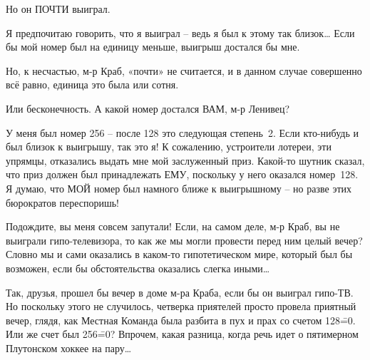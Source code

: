 \documentclass[../main.tex]{subfiles}
\begin{document}
\begin{dialogue}
 Но он ПОЧТИ выиграл.

 Я предпочитаю говорить, что я выиграл \--- ведь я был к этому так близок\ldots{} Если бы мой номер был на единицу меньше, выигрыш достался бы мне.

 Но, к несчастью, м-р Краб, «почти» не считается, и в данном случае совершенно всё равно, единица это была или сотня.

 Или бесконечность. А какой номер достался ВАМ, м-р Ленивец?

 У меня был номер 256 \--- после 128 это следующая степень~2. Если кто-нибудь и был близок к выигрышу, так это я! К сожалению, устроители лотереи, эти упрямцы, отказались выдать мне мой заслуженный приз. Какой-то шутник сказал, что приз должен был принадлежать ЕМУ, поскольку у него оказался номер~128. Я думаю, что МОЙ номер был намного ближе к выигрышному \--- но разве этих бюрократов переспоришь!

 Подождите, вы меня совсем запутали! Если, на самом деле, м-р Краб, вы не выиграли гипо-телевизора, то как же мы могли провести перед ним целый вечер? Словно мы и сами оказались в каком-то гипотетическом мире, который был бы возможен, если бы обстоятельства оказались слегка иными\ldots{}

 Так, друзья, прошел бы вечер в доме м-ра Краба, если бы он выиграл гипо-ТВ. Но поскольку этого не случилось, четверка приятелей просто провела приятный вечер, глядя, как Местная Команда была разбита в пух и прах со счетом 128\==0. Или же счет был 256\==0? Впрочем, какая разница, когда речь идет о пятимерном Плутонском хоккее на пару\ldots{}

\end{dialogue}
\end{document}
